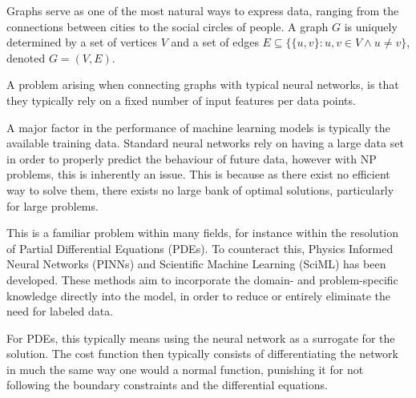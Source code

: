 Graphs serve as one of the most natural ways to express data, ranging from the connections between cities to the social circles of people.
A graph $G$ is uniquely determined by a set of vertices $V$ and a set of edges $E \subseteq \{ \{ u, v \} : u,v \in V \wedge u \neq v \}$, denoted $G=(V, E)$.

A problem arising when connecting graphs with typical neural networks, is that they typically rely on a fixed number of input features per data points.

A major factor in the performance of machine learning models is typically the available training data.
Standard neural networks rely on having a large data set in order to properly predict the behaviour of future data, however with NP problems, this is inherently an issue.
This is because as there exist no efficient way to solve them, there exists no large bank of optimal solutions, particularly for large problems.

This is a familiar problem within many fields, for instance within the resolution of Partial Differential Equations (PDEs).
To counteract this, Physics Informed Neural Networks (PINNs) and Scientific Machine Learning (SciML) has been developed.
These methods aim to incorporate the domain- and problem-specific knowledge directly into the model, in order to reduce or entirely eliminate the need for labeled data.

For PDEs, this typically means using the neural network as a surrogate for the solution.
The cost function then typically consists of differentiating the network in much the same way one would a normal function, punishing it for not following the boundary constraints and the differential equations.